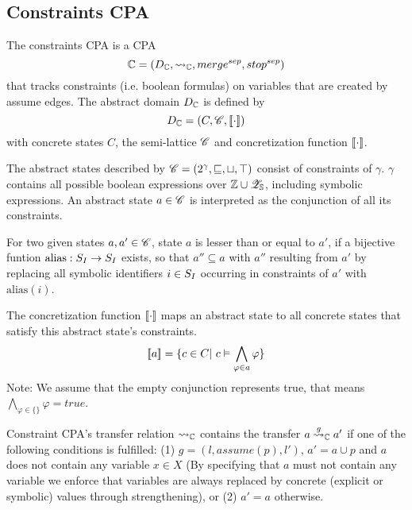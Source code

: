 \subsection{Constraints CPA}

The constraints CPA is a CPA \[\mathbb{C} = (D_{\mathbb{C}}, \rightsquigarrow_{\mathbb{C}}, merge^{sep}, stop^{sep})\] that tracks constraints (i.e. boolean formulas) on variables that are created by assume edges.
The abstract domain $D_{\mathbb{C}}$ is defined by 
\[D_{\mathbb{C}} = (C, \mathscr{C}, [\![ \cdot ]\!])\]
with concrete states $C$, the semi-lattice $\mathscr{C}$ and concretization function $[\![ \cdot ]\!]$.

The abstract states described by $\mathscr{C} = (2^\gamma, \sqsubseteq, \sqcup, \top)$ consist of constraints of $\gamma$.
$\gamma$ contains all possible boolean expressions over $\mathbb{Z} \cup \mathscr{Z}_{\mathbb{S}}$, including symbolic expressions.
An abstract state $a \in \mathscr{C}$ is interpreted as the conjunction of all its constraints.

For two given states $a, a' \in \mathscr{C}$, state $a$ is lesser than or equal to $a'$, if a bijective funtion $\text{alias}: S_I \rightarrow S_I$ exists, so that $a'' \subseteq a$ with $a''$ resulting from $a'$ by replacing all symbolic identifiers $i \in S_I$ occurring in constraints of $a'$ with $\text{alias}(i)$.

The concretization function $[\![ \cdot ]\!]$ maps an abstract state to all concrete states that satisfy this abstract state's constraints.
        \[ [\![ a ]\!] = \{ c \in C |\ c \vDash \displaystyle\bigwedge_{\varphi \in a} \varphi \} \]
        Note: We assume that the empty conjunction represents true, that means $\displaystyle\bigwedge_{\varphi \in \{\}} \varphi = true$.

Constraint CPA's transfer relation $\rightsquigarrow_{\mathbb{C}}$ contains the transfer $a \overset{g}{\rightsquigarrow}_{\mathbb{C}} a'$ if one of the following conditions is fulfilled:
(1) $g = (l, assume(p), l')$, $a' = a \cup {p}$ and $a$ does not contain any variable $x \in X$
(By specifying that $a$ must not contain any variable we enforce that variables are always replaced by concrete (explicit or symbolic) values through strengthening), or
(2) $a' = a$ otherwise.

